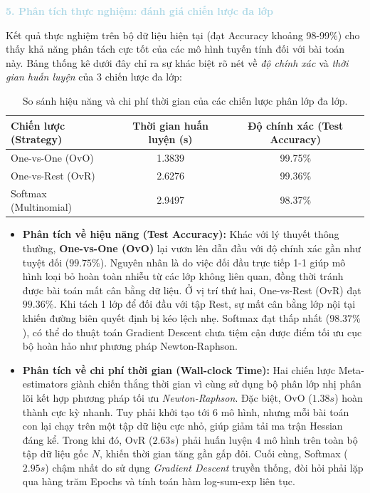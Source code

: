 \vspace{0.5em}
\noindent\textcolor{lightblue}{\textbf{5. Phân tích thực nghiệm: đánh giá chiến lược đa lớp}}
\vspace{0.5em}

Kết quả thực nghiệm trên bộ dữ liệu hiện tại (đạt Accuracy khoảng 98-99\%) cho thấy khả năng phân tách cực tốt của các mô hình tuyến tính đối với bài toán này. Bảng thống kê dưới đây chỉ ra sự khác biệt rõ nét về \textit{độ chính xác} và \textit{thời gian huấn luyện} của 3 chiến lược đa lớp:

\begin{table}[H]
    \centering
    \begin{tabular}{lcc}
        \toprule
        \textbf{Chiến lược (Strategy)} & \textbf{Thời gian huấn luyện (s)} & \textbf{Độ chính xác (Test Accuracy)} \\
        \midrule
        One-vs-One (OvO) & 1.3839 & 99.75\% \\
        One-vs-Rest (OvR) & 2.6276 & 99.36\% \\
        Softmax (Multinomial) & 2.9497 & 98.37\% \\
        \bottomrule
    \end{tabular}
    \caption{So sánh hiệu năng và chi phí thời gian của các chiến lược phân lớp đa lớp.}
    \label{tab:multiclass_benchmark}
\end{table}

\begin{itemize}
    \item \textbf{Phân tích về hiệu năng (Test Accuracy):} 
    Khác với lý thuyết thông thường, \textbf{One-vs-One (OvO)} lại vươn lên dẫn đầu với độ chính xác gần như tuyệt đối ($99.75\%$). Nguyên nhân là do việc đối đầu trực tiếp 1-1 giúp mô hình loại bỏ hoàn toàn nhiễu từ các lớp không liên quan, đồng thời tránh được bài toán mất cân bằng dữ liệu. Ở vị trí thứ hai, One-vs-Rest (OvR) đạt $99.36\%$. Khi tách 1 lớp để đối đầu với tập Rest, sự mất cân bằng lớp nội tại khiến đường biên quyết định bị kéo lệch nhẹ. Softmax đạt thấp nhất ($98.37\%$), có thể do thuật toán Gradient Descent chưa tiệm cận được điểm tối ưu cục bộ hoàn hảo như phương pháp Newton-Raphson.
    
    \item \textbf{Phân tích về chi phí thời gian (Wall-clock Time):}
    Hai chiến lược Meta-estimators giành chiến thắng thời gian vì cùng sử dụng bộ phân lớp nhị phân lõi kết hợp phương pháp tối ưu \textit{Newton-Raphson}. Đặc biệt, OvO ($1.38s$) hoàn thành cực kỳ nhanh. Tuy phải khởi tạo tới 6 mô hình, nhưng mỗi bài toán con lại chạy trên một tập dữ liệu cực nhỏ, giúp giảm tải ma trận Hessian đáng kể. Trong khi đó, OvR ($2.63s$) phải huấn luyện 4 mô hình trên toàn bộ tập dữ liệu gốc $N$, khiến thời gian tăng gần gấp đôi. Cuối cùng, Softmax ($2.95s$) chậm nhất do sử dụng \textit{Gradient Descent} truyền thống, đòi hỏi phải lặp qua hàng trăm Epochs và tính toán hàm log-sum-exp liên tục.
\end{itemize}

